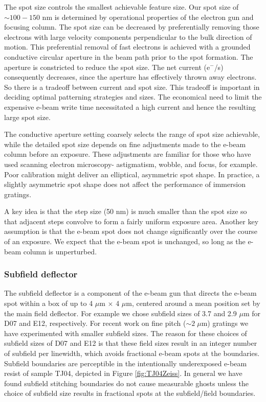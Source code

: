 The spot size controls the smallest achievable feature size.  Our spot size of $\sim 100 - 150$ nm is determined by operational properties of the electron gun and focusing column.  The spot size can be decreased by preferentially removing those electrons with large velocity components perpendicular to the bulk direction of motion.  This preferential removal of fast electrons is achieved with a grounded conductive circular aperture in the beam path prior to the spot formation.  The aperture is constricted to reduce the spot size.  The net current (e$^-$/s) consequently decreases, since the aperture has effectively thrown away electrons.  So there is a tradeoff between current and spot size.  This tradeoff is important in deciding optimal patterning strategies and sizes.  The economical need to limit the expensive e-beam write time necessitated a high current and hence the resulting large spot size.

The conductive aperture setting coarsely selects the range of spot size achievable, while the detailed spot size depends on fine adjustments made to the e-beam column before an exposure.  These adjustments are familiar for those who have used scanning electron microscopy- astigmatism, wobble, and focus, for example.  Poor calibration might deliver an elliptical, asymmetric spot shape.  In practice, a slightly asymmetric spot shape does not affect the performance of immersion gratings.

A key idea is that the step size (50 nm) is much smaller than the spot size so that adjacent steps convolve to form a fairly uniform exposure area.  Another key assumption is that the e-beam spot does not change significantly over the course of an exposure.  We expect that the e-beam spot is unchanged, so long as the e-beam column is unperturbed.

\subsubsection{Subfield deflector}
The subfield deflector is a component of the e-beam gun that directs the e-beam spot within a box of up to 4 $\mu$m $\times$ 4 $\mu$m, centered around a mean position set by the main field deflector.  For example we chose subfield sizes of 3.7 and 2.9 $\mu$m for D07 and E12, respectively.  For recent work on fine pitch ($\sim2\; \mu$m) gratings we have experimented with smaller subfield sizes.  The reason for these choices of subfield sizes of D07 and E12 is that these field sizes result in an integer number of subfield per linewidth, which avoids fractional e-beam spots at the boundaries.  Subfield boundaries are perceptible in the intentionally underexposed e-beam resist of sample TJ04, depicted in Figure \ref{fig:TJ04Zeiss}.  In general we have found subfield stitching boundaries do not cause measurable ghosts unless the choice of subfield size results in fractional spots at the subfield/field boundaries.  

